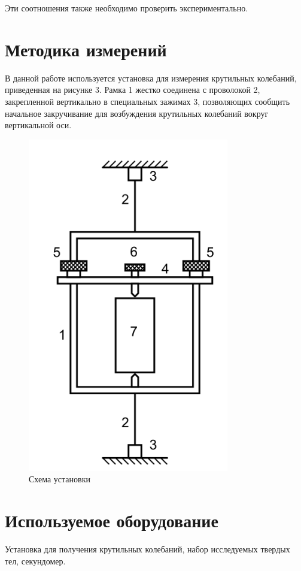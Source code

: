 \documentclass[a4paper, 12pt]{article}
\begin{document}
	Эти соотношения также необходимо проверить экспериментально.

 	\section{Методика измерений}
	В данной работе используется установка для измерения крутильных колебаний, приведенная
	на рисунке 3. Рамка 1 жестко соединена с проволокой 2, закрепленной вертикально в специальных
	зажимах 3, позволяющих сообщить начальное закручивание для возбуждения крутильных колебаний
	вокруг вертикальной оси.
	\begin{figure}[H]
		\centering
		\includegraphics[scale = 0.5]{pictures/stand.png}
		\caption{Схема установки}
	\end{figure}

%
%
	\section{Используемое оборудование}
	Установка для получения крутильных колебаний, набор исследуемых твердых тел, секундомер.

%
\end{document}

